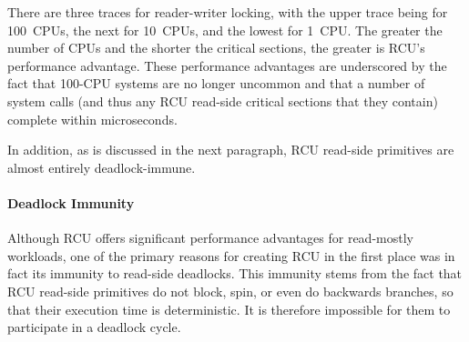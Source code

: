 \QuickQuizEnd

There are three traces for reader-writer locking, with the upper trace
being for 100~CPUs, the next for 10~CPUs, and the lowest for 1~CPU\@.
The greater the number of CPUs and the shorter the critical sections,
the greater is RCU's performance advantage.
These performance advantages are underscored by the fact that 100-CPU
systems are no longer uncommon and that a number of system calls (and
thus any RCU read-side critical sections that they contain) complete
within microseconds.

In addition, as is discussed in the next paragraph,
RCU read-side primitives are almost entirely deadlock-immune.


\paragraph{Deadlock Immunity}

Although RCU offers significant performance advantages for
read-mostly workloads, one of the primary reasons for creating
RCU in the first place was in fact its immunity to read-side
deadlocks.
This immunity stems from the fact that
RCU read-side primitives do not block, spin, or even
do backwards branches, so that their execution time is deterministic.
It is therefore impossible for them to participate in a deadlock
cycle.

